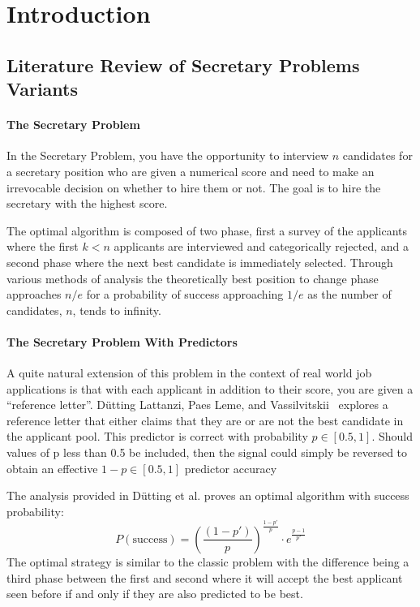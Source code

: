 \documentclass[a4paper,11pt]{article}
\begin{document}
\clearpage





\tableofcontents

    
\section{Introduction}

\subsection{Literature Review of Secretary Problems Variants}

\paragraph{The Secretary Problem}In the Secretary Problem, you have the opportunity to interview $n$ candidates for a secretary position who are given a numerical score and need to make an irrevocable decision on whether to hire them or not. The goal is to hire the secretary with the highest score.

The optimal algorithm is composed of two phase, first a survey of the applicants where the first $k < n$ applicants are interviewed and categorically rejected, and a second phase where the next best candidate is immediately selected. Through various methods of analysis the theoretically best position to change phase approaches $n/e$ for a probability of success approaching $1/e$ as the number of candidates, $n$, tends to infinity.

\paragraph{The Secretary Problem With Predictors}

A quite natural extension of this problem in the context of real world job applications is that with each applicant in addition to their score, you are given a ``reference letter''. D\"utting Lattanzi, Paes Leme, and Vassilvitskii~\cite{dütting2020secretariesadvice} explores a reference letter that either claims that they are or are not the best candidate in the applicant pool. This predictor is correct with probability $p \in [0.5,1]$. Should values of p less than 0.5 be included, then the signal could simply be reversed to obtain an effective $1-p \in [0.5,1]$ predictor accuracy

The analysis provided in D\"utting et al.\cite{dütting2020secretariesadvice} proves an optimal algorithm with success probability: $$P(\text{success}) = \left(\frac{\left(1-p'\right)}{p}\right)^{\frac{1-p' }{p}}\cdot e^{ \frac{p- 1}{p'} }$$ The optimal strategy is similar to the classic problem with the difference being a third phase between the first and second where it will accept the best applicant seen before if and only if they are also predicted to be best.  
\end{document}
